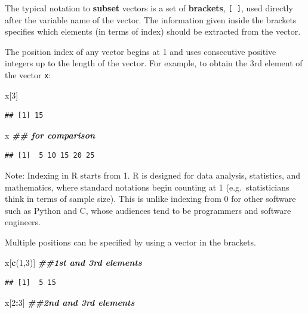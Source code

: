 \documentclass[
]{book}
\newenvironment{Shaded}{\begin{snugshade}}{\end{snugshade}}
\newcommand{\DecValTok}[1]{\textcolor[rgb]{0.00,0.00,0.81}{#1}}
\newcommand{\DocumentationTok}[1]{\textcolor[rgb]{0.56,0.35,0.01}{\textbf{\textit{#1}}}}
\newcommand{\FunctionTok}[1]{\textcolor[rgb]{0.13,0.29,0.53}{\textbf{#1}}}
\newcommand{\NormalTok}[1]{#1}
\newcommand{\SpecialCharTok}[1]{\textcolor[rgb]{0.81,0.36,0.00}{\textbf{#1}}}
\theoremstyle{definition}
\theoremstyle{definition}
\theoremstyle{definition}
\theoremstyle{definition}
\theoremstyle{remark}
\begin{document}
The typical notation to \textbf{subset} vectors is a set of \textbf{brackets}, \texttt{{[}\ {]}}, used directly after the variable name of the vector. The information given inside the brackets specifies which elements (in terms of index) should be extracted from the vector.

The position index of any vector begins at 1 and uses consecutive positive integers up to the length of the vector. For example, to obtain the 3rd element of the vector \texttt{x}:

\begin{Shaded}
\begin{Highlighting}[]
\NormalTok{x[}\DecValTok{3}\NormalTok{]}
\end{Highlighting}
\end{Shaded}

\begin{verbatim}
## [1] 15
\end{verbatim}

\begin{Shaded}
\begin{Highlighting}[]
\NormalTok{x }\DocumentationTok{\#\# for comparison}
\end{Highlighting}
\end{Shaded}

\begin{verbatim}
## [1]  5 10 15 20 25
\end{verbatim}

Note: Indexing in R starts from 1. R is designed for data analysis, statistics, and mathematics, where standard notations begin counting at 1 (e.g.~statisticians think in terms of sample size). This is unlike indexing from 0 for other software such as Python and C, whose audiences tend to be programmers and software engineers.

Multiple positions can be specified by using a vector in the brackets.

\begin{Shaded}
\begin{Highlighting}[]
\NormalTok{x[}\FunctionTok{c}\NormalTok{(}\DecValTok{1}\NormalTok{,}\DecValTok{3}\NormalTok{)] }\DocumentationTok{\#\#1st and 3rd elements}
\end{Highlighting}
\end{Shaded}

\begin{verbatim}
## [1]  5 15
\end{verbatim}

\begin{Shaded}
\begin{Highlighting}[]
\NormalTok{x[}\DecValTok{2}\SpecialCharTok{:}\DecValTok{3}\NormalTok{] }\DocumentationTok{\#\#2nd and 3rd elements}
\end{Highlighting}
\end{Shaded}
\end{document}
